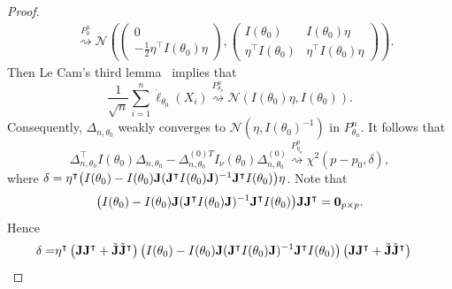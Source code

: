 \documentclass[11pt]{article}
\newcommand{\myT}{\intercal}
\theoremstyle{plain}
\theoremstyle{definition}
\theoremstyle{remark}
\begin{document}
\begin{appendices}
\begin{proof}
\begin{equation*}
\begin{split}
    &\overset{P_0^n}{\rightsquigarrow}
    \mathcal{N}\left(
    \left(
    \begin{matrix}
        0\\
        -\frac{1}{2}\eta^\myT  I(\theta_0)\eta
    \end{matrix}
    \right),
    \left(
        \begin{matrix}
            I(\theta_0)&I(\theta_0)\eta\\
            \eta^\myT  I(\theta_0)&\eta^\myT  I(\theta_0)\eta
        \end{matrix}
    \right)
    \right).
    \end{split}
\end{equation*}
Then Le Cam's third lemma~\citep[Example 6.7]{van2000asymptotic} implies that
\begin{equation*}
    \frac{1}{\sqrt{n}}\sum^n_{i=1}\dot{\ell}_{\theta_0}(X_i)\overset{P^n_{\theta_n}}{\rightsquigarrow} \mathcal{N}(I(\theta_0)\eta,I(\theta_0)).
\end{equation*}
Consequently,
$
\Delta_{n,\theta_0}
$
weakly converges to $\mathcal{N}(\eta, I(\theta_0)^{-1})$ in  $P^n_{\theta_n}$.
It follows that
\begin{equation*}
\Delta_{n,\theta_0}^\myT  I(\theta_0) \Delta_{n,\theta_0}
-
\Delta_{n,\theta_0}^{{(0)}T} I_\nu(\theta_0) \Delta^{(0)}_{n,\theta_0}
\overset{P_{\eta_n}^n}{\rightsquigarrow} \chi^2(p-p_0,\delta),
\end{equation*}
where $\delta =
\eta^\myT 
             \big(
             I(\theta_0)
            -
            I(\theta_0) \BJ (\BJ^\myT  I(\theta_0) \BJ)^{-1} \BJ^\myT  I(\theta_0)
        \big)
\eta$.
Note that
\begin{align*}
             \big(
             I(\theta_0)
            -
            I(\theta_0) \BJ (\BJ^\myT  I(\theta_0) \BJ)^{-1} \BJ^\myT  I(\theta_0)
        \big)
        \BJ \BJ^\myT = \mathbf 0_{p\times p}.
\end{align*}
Hence
\begin{align*}
    \delta=&
\eta^\myT 
        \left( \BJ \BJ^\myT + \tilde \BJ \tilde \BJ^\myT \right)
             \big(
             I(\theta_0)
            -
            I(\theta_0) \BJ (\BJ^\myT  I(\theta_0) \BJ)^{-1} \BJ^\myT  I(\theta_0)
        \big)
        \left( \BJ \BJ^\myT + \tilde \BJ \tilde \BJ^\myT \right)

\end{align*}
\end{proof}
\end{appendices}
\end{document}
